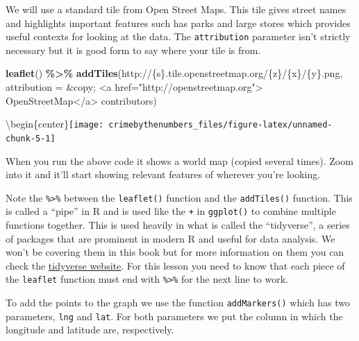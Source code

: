 \documentclass[
  12pt,
]{book}
\newenvironment{Shaded}{\begin{snugshade}}{\end{snugshade}}
\newcommand{\DataTypeTok}[1]{\textcolor[rgb]{0.27,0.27,0.27}{#1}}
\newcommand{\KeywordTok}[1]{\textcolor[rgb]{0.27,0.27,0.27}{\textbf{#1}}}
\newcommand{\NormalTok}[1]{#1}
\newcommand{\OperatorTok}[1]{\textcolor[rgb]{0.43,0.43,0.43}{\textbf{#1}}}
\newcommand{\StringTok}[1]{\textcolor[rgb]{0.5,0.5,0.5}{#1}}
\begin{document}
We will use a standard tile from Open Street Maps. This tile gives street names and highlights important features such has parks and large stores which provides useful contexts for looking at the data. The \texttt{attribution} parameter isn't strictly necessary but it is good form to say where your tile is from.

\begin{Shaded}
\begin{Highlighting}[]
\KeywordTok{leaflet}\NormalTok{() }\OperatorTok{\%>\%}\StringTok{ }
\StringTok{  }\KeywordTok{addTiles}\NormalTok{(}\StringTok{\textquotesingle{}http://\{s\}.tile.openstreetmap.org/\{z\}/\{x\}/\{y\}.png\textquotesingle{}}\NormalTok{, }
           \DataTypeTok{attribution =} \StringTok{\textquotesingle{}\&copy; <a href="http://openstreetmap.org">}
\StringTok{                OpenStreetMap</a> contributors\textquotesingle{}}\NormalTok{)}
\end{Highlighting}
\end{Shaded}

\textbackslash begin\{center\}\texttt{[image: crimebythenumbers\_files/figure-latex/unnamed-chunk-5-1]}

When you run the above code it shows a world map (copied several times). Zoom into it and it'll start showing relevant features of wherever you're looking.

Note the \texttt{\%\textgreater{}\%} between the \texttt{leaflet()} function and the \texttt{addTiles()} function. This is called a ``pipe'' in R and is used like the \texttt{+} in \texttt{ggplot()} to combine multiple functions together. This is used heavily in what is called the ``tidyverse'', a series of packages that are prominent in modern R and useful for data analysis. We won't be covering them in this book but for more information on them you can check the \href{https://www.tidyverse.org/}{tidyverse website}. For this lesson you need to know that each piece of the \texttt{leaflet} function must end with \texttt{\%\textgreater{}\%} for the next line to work.

To add the points to the graph we use the function \texttt{addMarkers()} which has two parameters, \texttt{lng} and \texttt{lat}. For both parameters we put the column in which the longitude and latitude are, respectively.

\begin{Shaded}
\end{Shaded}
\end{document}
